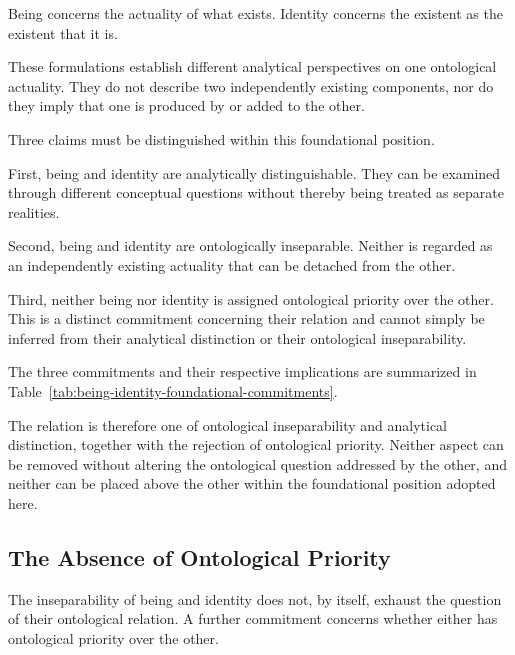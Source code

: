 Being concerns the actuality of what exists.
Identity concerns the existent as the existent
that it is.

These formulations establish different analytical
perspectives on one ontological actuality.
They do not describe two independently existing
components, nor do they imply that one is produced
by or added to the other.

Three claims must be distinguished within this
foundational position.

First, being and identity are analytically
distinguishable. They can be examined through
different conceptual questions without thereby
being treated as separate realities.

Second, being and identity are ontologically
inseparable. Neither is regarded as an independently
existing actuality that can be detached from
the other.

Third, neither being nor identity is assigned
ontological priority over the other. This is
a distinct commitment concerning their relation
and cannot simply be inferred from their analytical
distinction or their ontological inseparability.

The three commitments and their respective
implications are summarized in
Table~\ref{tab:being-identity-foundational-commitments}.



The relation is therefore one of ontological
inseparability and analytical distinction,
together with the rejection of ontological
priority. Neither aspect can be removed without
altering the ontological question addressed
by the other, and neither can be placed above
the other within the foundational position
adopted here.



\subsection{The Absence of Ontological Priority}

The inseparability of being and identity
does not, by itself, exhaust the question
of their ontological relation. A further
commitment concerns whether either has
ontological priority over the other.

